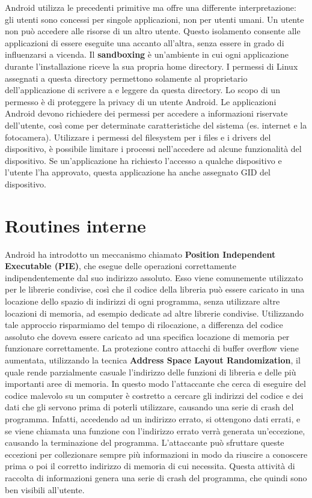 Android utilizza le precedenti primitive ma offre una differente interpretazione: gli utenti sono concessi per singole applicazioni, non per utenti umani. Un utente non può accedere alle risorse di un altro utente. Questo isolamento consente alle applicazioni di essere eseguite una accanto all'altra, senza essere in grado di influenzarsi a vicenda. Il \textbf{sandboxing} è un'ambiente in cui ogni applicazione durante l'installazione riceve la sua propria home directory. I permessi di Linux assegnati a questa directory permettono solamente al proprietario dell'applicazione di scrivere a e leggere da questa directory. Lo scopo di un permesso è di proteggere la privacy di un utente Android. Le applicazioni Android devono richiedere dei permessi per accedere a informazioni riservate dell'utente, così come per determinate caratteristiche del sistema (es. internet e la fotocamera). Utilizzare i permessi del filesystem per i files e i drivers del dispositivo, è possibile limitare i processi nell'accedere ad alcune funzionalità del dispositivo. Se un'applicazione ha richiesto l'accesso a qualche dispositivo e l'utente l'ha approvato, questa applicazione ha anche assegnato GID del dispositivo.
\section{Routines interne}
Android ha introdotto un meccanismo chiamato \textbf{Position Independent Executable (PIE)}, che esegue delle operazioni correttamente indipendentemente dal suo indirizzo assoluto. Esso viene comunemente utilizzato per le librerie condivise, così che il codice della libreria può essere caricato in una locazione dello spazio di indirizzi di ogni programma, senza utilizzare altre locazioni di memoria, ad esempio dedicate ad altre librerie condivise. Utilizzando tale approccio risparmiamo del tempo di rilocazione, a differenza del codice assoluto che doveva essere caricato ad una specifica locazione di memoria per funzionare correttamente. La protezione contro attacchi di buffer overflow viene aumentata, utilizzando la tecnica \textbf{Address Space Layout Randomization}, il quale rende parzialmente casuale l'indirizzo delle funzioni di libreria e delle più importanti aree di memoria. In questo modo l'attaccante che cerca di eseguire del codice malevolo su un computer è costretto a cercare gli indirizzi del codice e dei dati che gli servono prima di poterli utilizzare, causando una serie di crash del programma. Infatti, accedendo ad un indirizzo errato, si ottengono dati errati, e se viene chiamata una funzione con l'indirizzo errato verrà generata un'eccezione, causando la terminazione del programma. L'attaccante può sfruttare queste eccezioni per collezionare sempre più informazioni in modo da riuscire a conoscere prima o poi il corretto indirizzo di memoria di cui necessita. Questa attività di raccolta di informazioni genera una serie di crash del programma, che quindi sono ben visibili all'utente. 
